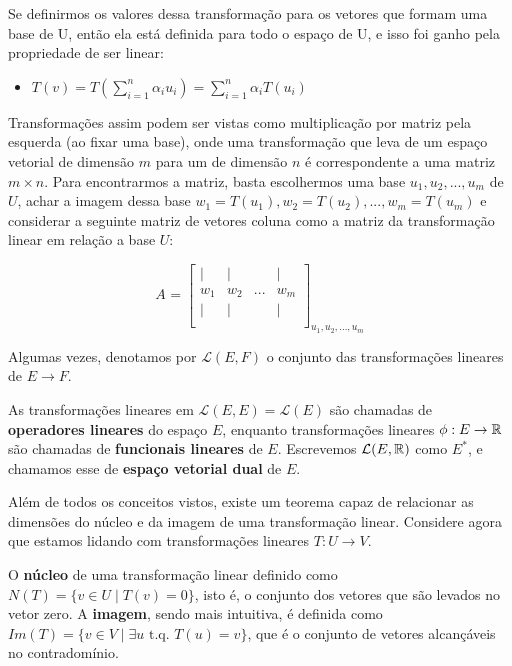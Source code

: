 \documentclass[11pt, a4paper]{article}
\begin{document}
Se definirmos os valores dessa transformação para os vetores que formam uma base de U, então ela está definida para todo o espaço de U, e isso foi ganho pela propriedade de ser linear:

\begin{itemize}
    \item \(\displaystyle T(v)=T\left(\sum_{i=1}^{n}{\alpha_iu_i}\right)=\sum_{i=1}^{n}{\alpha_iT(u_i)}\)
\end{itemize}

Transformações assim podem ser vistas como multiplicação por matriz pela esquerda (ao fixar uma base), onde uma transformação que leva de um espaço vetorial de dimensão \(m\) para um de dimensão \(n\) é correspondente a uma matriz \(m\times n\). Para encontrarmos a matriz, basta escolhermos uma base \(u_1, u_2, ..., u_m\) de \(U\), achar a imagem dessa base \(w_1=T(u_1), w_2=T(u_2), ..., w_m=T(u_m)\) e considerar a seguinte matriz de vetores coluna como a matriz da transformação linear em relação a base \(U\):

\void[-1.5]

\[
A_{}=
\begin{bmatrix}
    |&|&&|\\
    w_1&w_2&...&w_m\\
    |&|&&|\\
\end{bmatrix}_{u_1,u_2,...,u_m}
\]

Algumas vezes, denotamos por \(\mathcal{L}(E,F)\) o conjunto das transformações lineares de \(E\rightarrow F\).

As transformações lineares em \(\mathcal{L}(E,E)=\mathcal{L}(E)\) são chamadas de \textbf{operadores lineares} do espaço \(E\), enquanto transformações lineares \(\phi : E \rightarrow \mathbb{R}\) são chamadas de \textbf{funcionais lineares} de \(E\). Escrevemos \(\mathcal{L}(E,\mathbb{R})\) como \(E^*\), e chamamos esse de \textbf{espaço vetorial dual} de \(E\).

Além de todos os conceitos vistos, existe um teorema capaz de relacionar as dimensões do núcleo e da imagem de uma transformação linear. Considere agora que estamos lidando com transformações lineares \(T:U \rightarrow V\).

O \textbf{núcleo} de uma transformação linear definido como \(N(T)=\{v\in U \mid T(v)=0\}\), isto é, o conjunto dos vetores que são levados no vetor zero. A \textbf{imagem}, sendo mais intuitiva, é definida como \(Im(T)=\{v\in V \mid \exists u \text{ t.q. } T(u)=v\}\), que é o conjunto de vetores alcançáveis no contradomínio.
\end{document}
